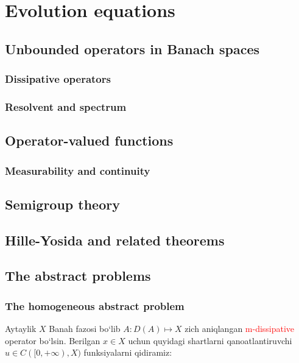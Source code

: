 \section{Evolution equations}
\subsection{Unbounded operators in Banach spaces}

\subsubsection{Dissipative operators}
\subsubsection{Resolvent and spectrum}
\subsection{Operator-valued functions}
\subsubsection{Measurability and continuity}
\subsection{Semigroup theory}
\subsection{Hille-Yosida and related theorems}
\subsection{The abstract problems}
\subsubsection{The homogeneous abstract problem}
Aytaylik $X$ Banah fazosi bo`lib $A:D(A)\mapsto X$ zich aniqlangan \textcolor{red}{m-dissipative} operator bo`lsin. Berilgan $x\in X$ uchun quyidagi shartlarni qanoatlantiruvchi $u\in C([0, +\infty), X)$ funksiyalarni qidiramiz:

